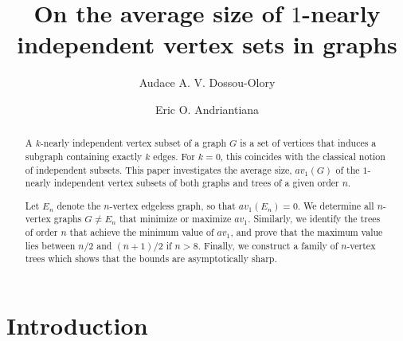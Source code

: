 \documentclass[a4paper,12pt]{amsart}
\title{On the average size of $1$-nearly independent vertex sets in graphs}
\author{Audace A. V. Dossou-Olory}
\author{Eric O. Andriantiana}
\theoremstyle{remark}
\begin{document}
\begin{abstract}
A $k$-nearly independent vertex subset of a graph $G$ is a set of vertices that induces a subgraph containing exactly $k$ edges. For $k = 0$, this coincides with the classical notion of independent subsets. This paper investigates the average size, $av_1(G)$ of the $1$-nearly independent vertex subsets of both graphs and trees of a given order $n$.

Let $E_n$ denote the $n$-vertex edgeless graph, so that $av_1(E_n) = 0$. We determine all $n$-vertex graphs $G\neq E_n$ that minimize or maximize $av_1$. Similarly, we identify the trees of order $n$ that achieve the minimum value of $av_1$, and prove that the maximum value lies between $n/2$ and $(n+1)/2$ if $n>8$. Finally, we construct a family of $n$-vertex trees which shows that the bounds are asymptotically sharp.






\end{abstract}

\maketitle


\section{Introduction}
\end{document}
